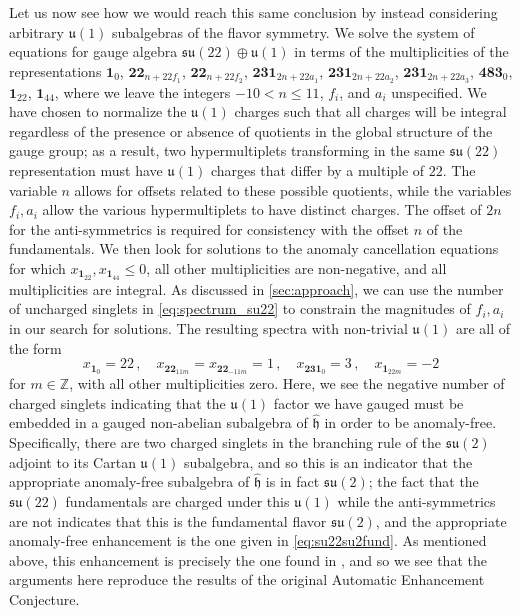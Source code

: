 \documentclass[11pt, a4paper]{article}
\newcommand*{\bbZ}{\ensuremath{\mathbb{Z}}}
\newcommand*{\fkh}{\ensuremath{\mathfrak{h}}}
\newcommand*{\fku}{\ensuremath{\mathfrak{u}}}
\newcommand*{\fksu}{\ensuremath{\mathfrak{su}}}
\begin{document}
Let us now see how we would reach this same conclusion by instead considering arbitrary $\fku(1)$ subalgebras of the flavor symmetry. We solve the system of equations  for gauge algebra $\fksu(22) \oplus \fku(1)$ in terms of the multiplicities of the representations $\bm{1}_0$, $\bm{22}_{n + 22 f_1}$, $\bm{22}_{n + 22 f_2}$, $\bm{231}_{2 n + 22 a_1}$, $\bm{231}_{2 n + 22 a_2}$, $\bm{231}_{2 n + 22 a_3}$, $\bm{483}_0$, $\bm{1}_{22}$, $\bm{1}_{44}$, where we leave the integers $-10 < n \le 11$, $f_i$, and $a_i$ unspecified. We have chosen to normalize the $\fku(1)$ charges such that all charges will be integral regardless of the presence or absence of quotients in the global structure of the gauge group; as a result, two hypermultiplets transforming in the same $\fksu(22)$ representation must have $\fku(1)$ charges that differ by a multiple of $22$. The variable $n$ allows for offsets related to these possible quotients, while the variables $f_i, a_i$ allow the various hypermultiplets to have distinct charges. The offset of $2 n$ for the anti-symmetrics is required for consistency with the offset $n$ of the fundamentals.
We then look for solutions to the anomaly cancellation equations for which $x_{\bm{1}_{22}}, x_{\bm{1}_{44}} \le 0$, all other multiplicities are non-negative, and all multiplicities are integral. As discussed in \cref{sec:approach}, we can use the number of uncharged singlets in \cref{eq:spectrum_su22} to constrain the magnitudes of $f_i, a_i$ in our search for solutions. The resulting spectra with non-trivial $\fku(1)$ are all of the form
    \begin{equation}
        x_{\bm{1}_0} = 22\,, \quad x_{\bm{22}_{11 m}} = x_{\bm{22}_{-11 m}} = 1\,, \quad x_{\bm{231}_0} = 3\,, \quad x_{\bm{1}_{22 m}} = -2
    \end{equation}
for $m \in \bbZ$, with all other multiplicities zero. Here, we see the negative number of charged singlets indicating that the $\fku(1)$ factor we have gauged must be embedded in a gauged non-abelian subalgebra of $\hat{\fkh}$ in order to be anomaly-free. Specifically, there are two charged singlets in the branching rule of the $\fksu(2)$ adjoint to its Cartan $\fku(1)$ subalgebra, and so this is an indicator that the appropriate anomaly-free subalgebra of $\hat{\fkh}$ is in fact $\fksu(2)$; the fact that the $\fksu(22)$ fundamentals are charged under this $\fku(1)$ while the anti-symmetrics are not indicates that this is the fundamental flavor $\fksu(2)$, and the appropriate anomaly-free enhancement is the one given in \cref{eq:su22su2fund}. As mentioned above, this enhancement is precisely the one found in \cite{Raghuram:2020vxm}, and so we see that the arguments here reproduce the results of the original Automatic Enhancement Conjecture.
\end{document}
